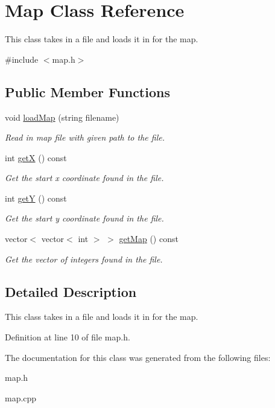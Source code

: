 \hypertarget{classMap}{}\section{Map Class Reference}
\label{classMap}


This class takes in a file and loads it in for the map.  




{\ttfamily \#include $<$map.\+h$>$}

\subsection*{Public Member Functions}
\begin{DoxyCompactItemize}
\item 
\mbox{\label{classMap_a51e1c9c777bc6c4171707f1528a73dc6}} 
void \hyperlink{classMap_a51e1c9c777bc6c4171707f1528a73dc6}{load\+Map} (string filename)
\begin{DoxyCompactList}\small\item\em Read in map file with given path to the file. \end{DoxyCompactList}\item 
\mbox{\label{classMap_a4b4b995cd7b54aa9d8b87f353c0d88c5}} 
int \hyperlink{classMap_a4b4b995cd7b54aa9d8b87f353c0d88c5}{getX} () const
\begin{DoxyCompactList}\small\item\em Get the start x coordinate found in the file. \end{DoxyCompactList}\item 
\mbox{\label{classMap_a0205e02d14a6112ae96cde67b87e2da2}} 
int \hyperlink{classMap_a0205e02d14a6112ae96cde67b87e2da2}{getY} () const
\begin{DoxyCompactList}\small\item\em Get the start y coordinate found in the file. \end{DoxyCompactList}\item 
\mbox{\label{classMap_a0b54608da842cf193f6a6fb7838076f2}} 
vector$<$ vector$<$ int $>$ $>$ \hyperlink{classMap_a0b54608da842cf193f6a6fb7838076f2}{get\+Map} () const
\begin{DoxyCompactList}\small\item\em Get the vector of integers found in the file. \end{DoxyCompactList}\end{DoxyCompactItemize}


\subsection{Detailed Description}
This class takes in a file and loads it in for the map. 

Definition at line 10 of file map.\+h.



The documentation for this class was generated from the following files\+:\begin{DoxyCompactItemize}
\item 
map.\+h\item 
map.\+cpp\end{DoxyCompactItemize}
